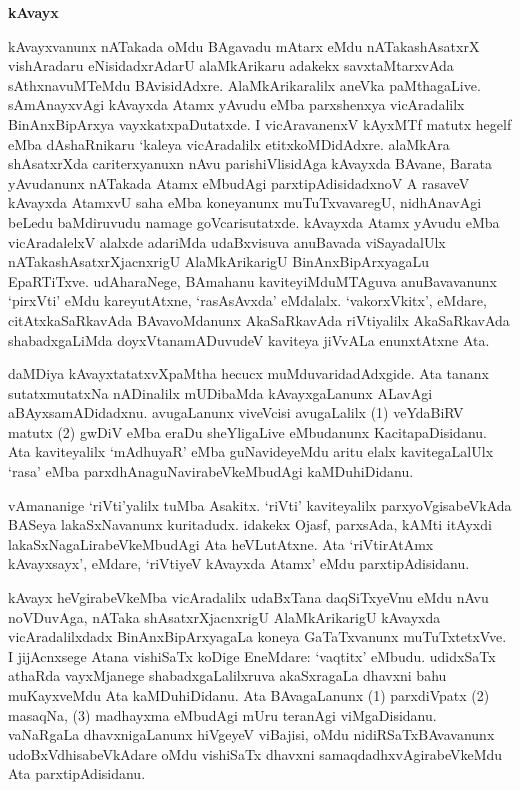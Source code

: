 \bigskip
\begin{center}
{\Large\bf kAvayx}
\end{center}

kAvayxvanunx nATakada oMdu BAgavadu mAtarx eMdu nATakashAsatxrX vishAradaru eNisidadxrAdarU alaMkArikaru adakekx savxtaMtarxvAda sAthxnavuMTeMdu BAvisidAdxre. AlaMkArikaralilx aneVka paMthagaLive. sAmAnayxvAgi kAvayxda Atamx yAvudu eMba parxshenxya vicAradalilx BinAnxBipArxya vayxkatxpaDutatxde. I vicAravanenxV kAyxMTf matutx hegelf eMba dAshaRnikaru `kaleya vicAradalilx etitxkoMDidAdxre. alaMkAra shAsatxrXda cariterxyanuxn nAvu parishiVlisidAga kAvayxda BAvane, Barata yAvudanunx nATakada Atamx eMbudAgi parxtipAdisidadxnoV A rasaveV kAvayxda AtamxvU saha eMba koneyanunx muTuTxvavaregU, nidhAnavAgi beLedu baMdiruvudu namage goVcarisutatxde. kAvayxda Atamx yAvudu eMba vicAradalelxV alalxde adariMda udaBxvisuva anuBavada viSayadalUlx nATakashAsatxrXjacnxrigU AlaMkArikarigU BinAnxBipArxyagaLu EpaRTiTxve. udAharaNege, BAmahanu kaviteyiMduMTAguva anuBavavanunx `pirxVti' eMdu kareyutAtxne, `rasAsAvxda' eMdalalx. `vakorxVkitx', eMdare, citAtxkaSaRkavAda BAvavoMdanunx AkaSaRkavAda riVtiyalilx AkaSaRkavAda shabadxgaLiMda doyxVtanamADuvudeV kaviteya jiVvALa enunxtAtxne Ata.

daMDiya kAvayxtatatxvXpaMtha hecucx muMduvaridadAdxgide. Ata tananx sutatxmutatxNa nADinalilx mUDibaMda kAvayxgaLanunx ALavAgi aBAyxsamADidadxnu. avugaLanunx viveVcisi avugaLalilx (1) veYdaBiRV matutx (2) gwDiV eMba eraDu sheYligaLive eMbudanunx KacitapaDisidanu. Ata kaviteyalilx `mAdhuyaR' eMba guNavideyeMdu aritu elalx kavitegaLalUlx `rasa' eMba parxdhAnaguNavirabeVkeMbudAgi kaMDuhiDidanu.

vAmananige `riVti'yalilx tuMba Asakitx. `riVti' kaviteyalilx parxyoVgisabeVkAda BASeya lakaSxNavanunx kuritadudx. idakekx Ojasf, parxsAda, kAMti itAyxdi lakaSxNagaLirabeVkeMbudAgi Ata heVLutAtxne. Ata `riVtirAtAmx kAvayxsayx', eMdare, `riVtiyeV kAvayxda Atamx' eMdu parxtipAdisidanu.

kAvayx heVgirabeVkeMba vicAradalilx udaBxTana daqSiTxyeVnu eMdu nAvu noVDu\-vAga, nATaka shAsatxrXjacnxrigU AlaMkArikarigU kAvayxda vicAradalilxdadx BinAnxBipArxyagaLa koneya GaTaTxvanunx muTuTxtetxVve. I jijAcnxsege Atana vishiSaTx koDige EneMdare: `vaqtitx' eMbudu. udidxSaTx athaRda vayxMjanege shabadxgaLalilxruva akaSxragaLa dhavxni bahu muKayxveMdu Ata kaMDuhiDidanu. Ata BAvagaLanunx (1) parxdiVpatx (2) masaqNa, (3) madhayxma eMbudAgi mUru teranAgi viMgaDisidanu. vaNaRgaLa dhavxnigaLanunx hiVgeyeV viBajisi, oMdu nidiRSaTxBAvavanunx udoBxVdhisabeVkAdare oMdu vishiSaTx dhavxni samaqdadhxvAgirabeVkeMdu Ata parxtipAdisidanu.

